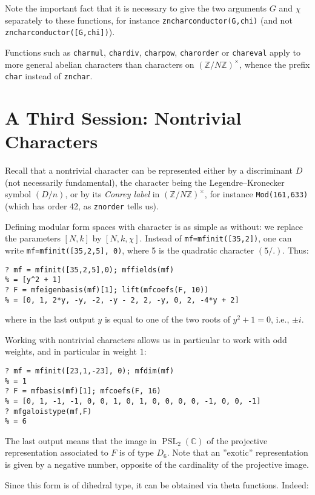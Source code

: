 \documentclass[11pt]{article}
\DeclareMathOperator{\PSL}{PSL}
\newcommand{\Z}{{\mathbb Z}}
\newcommand{\C}{{\mathbb C}}
\def\kbd#1{{\tt #1}}
\begin{document}
Note the important fact that it is necessary to give the two arguments $G$ and
$\chi$ separately to these functions, for instance \kbd{zncharconductor(G,chi)}
(and not \kbd{zncharconductor([G,chi])}).

Functions such as \kbd{charmul}, \kbd{chardiv}, \kbd{charpow},
\kbd{charorder} or \kbd{chareval} apply to more general abelian characters
than characters on $(\Z/N\Z)^\times$, whence the prefix \kbd{char} instead of
\kbd{znchar}.

\section{A Third Session: Nontrivial Characters}

Recall that a nontrivial character can be represented either by a discriminant
$D$ (not necessarily fundamental), the character being the Legendre--Kronecker
symbol $(D/n)$, or by its \emph{Conrey label} in $(\Z/N\Z)^\times$, for
instance \kbd{Mod(161,633)} (which has order 42, as \kbd{znorder} tells us).

Defining modular form spaces with character is as simple as without:
we replace the parameters $[N,k]$ by $[N,k,\chi]$.
Instead of \kbd{mf=mfinit([35,2])}, one can write
\kbd{mf=mfinit([35,2,5], 0)}, where 5 is the quadratic character $(5/.)$. Thus:

\begin{verbatim}
? mf = mfinit([35,2,5],0); mffields(mf)
% = [y^2 + 1]
? F = mfeigenbasis(mf)[1]; lift(mfcoefs(F, 10))
% = [0, 1, 2*y, -y, -2, -y - 2, 2, -y, 0, 2, -4*y + 2]
\end{verbatim}
where in the last output $y$ is equal to one of the two roots of $y^2+1=0$,
i.e., $\pm i$.

Working with nontrivial characters allows us in particular to work with odd
weights, and in particular in weight $1$:

\begin{verbatim}
? mf = mfinit([23,1,-23], 0); mfdim(mf)
% = 1
? F = mfbasis(mf)[1]; mfcoefs(F, 16)
% = [0, 1, -1, -1, 0, 0, 1, 0, 1, 0, 0, 0, 0, -1, 0, 0, -1]
? mfgaloistype(mf,F)
% = 6
\end{verbatim}

The last output means that the image in $\PSL_2(\C)$ of the projective
representation associated to $F$ is of type $D_6$. Note that an ''exotic''
representation is given by a negative number, opposite of the cardinality
of the projective image.

Since this form is of dihedral type, it can be obtained via theta functions.
Indeed:
\end{document}
